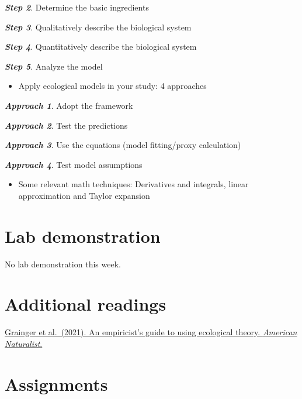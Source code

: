 \documentclass[
]{book}
\providecommand{\tightlist}{%
  \setlength{\itemsep}{0pt}\setlength{\parskip}{0pt}}
\begin{document}
{\textbf{\emph{Step 2}}. Determine the basic ingredients}

{\textbf{\emph{Step 3}}. Qualitatively describe the biological system}

{\textbf{\emph{Step 4}}. Quantitatively describe the biological system}

{\textbf{\emph{Step 5}}. Analyze the model}

\begin{itemize}
\tightlist
\item
  Apply ecological models in your study: 4 approaches
\end{itemize}

{\textbf{\emph{Approach 1}}. Adopt the framework}

{\textbf{\emph{Approach 2}}. Test the predictions}

{\textbf{\emph{Approach 3}}. Use the equations (model fitting/proxy calculation)}

{\textbf{\emph{Approach 4}}. Test model assumptions}

\begin{itemize}
\tightlist
\item
  Some relevant math techniques: Derivatives and integrals, linear approximation and Taylor expansion
\end{itemize}

\hypertarget{lab-demonstration}{%
\section*{Lab demonstration}\label{lab-demonstration}}

No lab demonstration this week.

\hypertarget{additional-readings}{%
\section*{Additional readings}\label{additional-readings}}

\href{./Additional\%20readings/Week1_Reading_Grainger_et_al_2021_AmNat.pdf}{Grainger et al.~(2021). An empiricist's guide to using ecological theory. \emph{American Naturalist}.}

\hypertarget{assignments}{%
\section*{Assignments}\label{assignments}}
\end{document}
